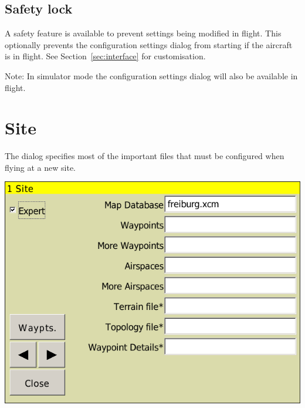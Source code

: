 \documentclass[a4paper,12pt]{refrep}
\begin{document}
\subsection*{Safety lock}

A safety feature is available to prevent settings being modified in
flight.  This optionally prevents the configuration settings dialog
from starting if the aircraft is in flight. See Section~\ref{sec:interface} for customisation.

Note: In simulator mode the configuration settings dialog will also be available in flight.



\clearpage
\section{Site}
The dialog specifies most of the important files that must be
configured when flying at a new site.

\begin{center}
\includegraphics[angle=0,width=0.8\linewidth,keepaspectratio='true']{figures/config-site.png}
\end{center}
\end{document}
